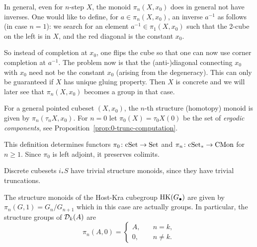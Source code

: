 \begin{remark}\label{rem:structure-mon-not-grouplike}
In general, even for $n$-step $X$, the monoid $\pi_n(X,x_0)$ does in general not have inverses.
One would like to define, for $a\in\pi_n(X,x_0)$, an inverse $a^{-1}$ as follows (in case $n=1$):
we search for an element $a^{-1}\in\pi_1(X,x_0)$ such that the 2-cube on the left is in $X$,
and the red diagonal is the constant $x_0$.
\begin{center}
\end{center}
So instead of completion at $x_0$, one flips the cube so that one can now use corner completion at $a^{-1}$.
The problem now is that the (anti-)diagonal connecting $x_0$ with $x_0$ need not be the constant $x_0$
(arising from the degeneracy).
This can only be guaranteed if $X$ has unique gluing property.
Then $X$ is concrete and we will later see that $\pi_n(X,x_0)$ becomes a group in that case.
\end{remark}

\begin{definition}\label{def:structure-monoid-general}
For a general pointed cubeset $(X,x_0)$, the $n$-th structure (homotopy) monoid is given by $\pi_n(\tau_n X,x_0)$.
For $n=0$ let $\pi_0(X) = \tau_0 X(0)$ be the set of \emph{ergodic components},
see Proposition~\ref{prop:0-trunc-computation}.
\end{definition}

This definition determines functors $\pi_0\colon\mathrm{cSet}\to\mathrm{Set}$
and $\pi_n\colon\mathrm{cSet}_\ast\to\mathrm{CMon}$ for $n\geq 1$.
Since $\pi_0$ is left adjoint, it preserves colimits.

\begin{example}\label{ex:HK_homotopy_groups}
Discrete cubesets $i_\ast S$ have trivial structure monoids, since they have trivial truncations.

The structure monoids of the Host-Kra cubegroup $\operatorname{HK}(G_\bullet)$ are given by
$\pi_n(G,1)=G_n/G_{n+1}$ which in this case are actually groups.
In particular, the structure groups of $\mathcal{D}_k(A)$ are
\[
    \pi_n(A,0) = \begin{cases}
        A,\quad & n = k, \\
        0,\quad & n \neq k.
    \end{cases}
\]
\end{example}

